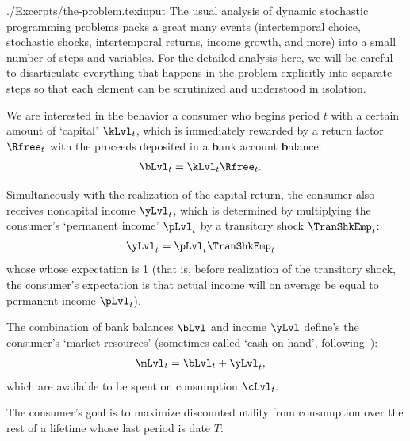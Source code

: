 \documentclass[titlepage, headings=optiontotocandhead]{\econtex}
\providecommand{\interval}{period}\renewcommand{\interval}{period}
\providecommand{\interval}{period}\renewcommand{\interval}{period}
\begin{document}
\begin{verbatimwrite}{./Excerpts/the-problem.texinput}
The usual analysis of dynamic stochastic programming problems packs a great many events (intertemporal choice, stochastic shocks, intertemporal returns, income growth, and more) into a small number of steps and variables. For the detailed analysis here, we will be careful to disarticulate everything that happens in the problem explicitly into separate steps so that each element can be scrutinized and understood in isolation.

We are interested in the behavior a consumer who begins {\interval} $t$ with a certain amount of `capital' $\kLvl_{t}$, which is immediately rewarded by a return factor $\Rfree_{t}$ with the proceeds deposited in a \textbf{b}ank account \textbf{b}alance:
\begin{equation}\begin{gathered}\begin{aligned}
  \bLvl_{t} & = \kLvl_{t}\Rfree_{t}. \label{eq:bLvl}
\end{aligned}\end{gathered}\end{equation}


Simultaneously with the realization of the capital return, the consumer also receives noncapital income $\yLvl_{t}$, which is determined by multiplying the consumer's `permanent income' $\pLvl_{t}$ by a transitory shock $\TranShkEmp_{t}$:
\begin{equation}\begin{gathered}\begin{aligned}
  \yLvl_{t} & = \pLvl_{t}\TranShkEmp_{t} \label{eq:yLvl}
\end{aligned}\end{gathered}\end{equation}
whose whose expectation is 1 (that is, before realization of the transitory shock, the consumer's expectation is that actual income will on average be equal to permanent income $\pLvl_{t}$).

The combination of bank balances $\bLvl$ and income $\yLvl$ define's the consumer's `market resources' (sometimes called `cash-on-hand', following~\cite{deatonUnderstandingC}):
\begin{equation}\begin{gathered}\begin{aligned}
  \mLvl_{t} & = \bLvl_{t}+\yLvl_{t} \label{eq:mLvl}, 
\end{aligned}\end{gathered}\end{equation}
which are available to be spent on consumption $\cLvl_{t}$.  

The consumer's goal is to maximize discounted utility from consumption over the rest of a lifetime whose last {\interval} is date $T$:
\end{verbatimwrite}

\end{document}
